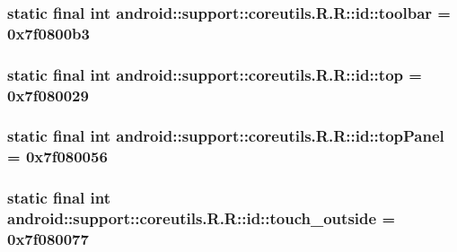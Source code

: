 \hypertarget{classandroid_1_1support_1_1coreutils_1_1_r_1_1id_1428f1ce76e4992fe870b156355f5e98}{
\subsubsection[{toolbar}]{\setlength{\rightskip}{0pt plus 5cm}static final int android::support::coreutils.R.R::id::toolbar = 0x7f0800b3}}
\label{classandroid_1_1support_1_1coreutils_1_1_r_1_1id_1428f1ce76e4992fe870b156355f5e98}


\hypertarget{classandroid_1_1support_1_1coreutils_1_1_r_1_1id_48132fa2871044ef067ce1d1bed85e4e}{
\subsubsection[{top}]{\setlength{\rightskip}{0pt plus 5cm}static final int android::support::coreutils.R.R::id::top = 0x7f080029}}
\label{classandroid_1_1support_1_1coreutils_1_1_r_1_1id_48132fa2871044ef067ce1d1bed85e4e}


\hypertarget{classandroid_1_1support_1_1coreutils_1_1_r_1_1id_dcd158a2004eb8b26c75cda596c14fdf}{
\subsubsection[{topPanel}]{\setlength{\rightskip}{0pt plus 5cm}static final int android::support::coreutils.R.R::id::topPanel = 0x7f080056}}
\label{classandroid_1_1support_1_1coreutils_1_1_r_1_1id_dcd158a2004eb8b26c75cda596c14fdf}


\hypertarget{classandroid_1_1support_1_1coreutils_1_1_r_1_1id_5ed814fc9ddb15918b30e1eb7dfe79ef}{
\subsubsection[{touch\_\-outside}]{\setlength{\rightskip}{0pt plus 5cm}static final int android::support::coreutils.R.R::id::touch\_\-outside = 0x7f080077}}
\label{classandroid_1_1support_1_1coreutils_1_1_r_1_1id_5ed814fc9ddb15918b30e1eb7dfe79ef}


